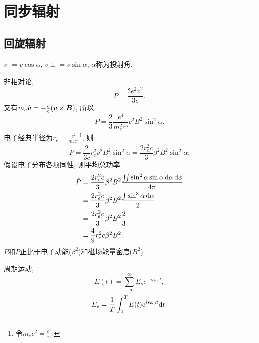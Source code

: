 \chapter{同步辐射}

\section{回旋辐射}\label{cyclotron}

$v_\parallel=v\cos\alpha$, $v\perp=v\sin\alpha$, $\alpha$称为投射角.

非相对论,
\begin{equation}
    P=\frac{2e^2\dot{v}^2}{3c}.
\end{equation}
又有$m_e\dot{\boldsymbol{v}}=-\frac{e}{c}(\boldsymbol{v}\times\boldsymbol{B})$, 所以
\begin{equation}
    P=\frac{2}{3}\frac{e^4}{m_e^2c^5}v^2B^2\sin^2\alpha.
\end{equation}
电子经典半径为$r_e=\frac{e^2}{m_ec^2}$\footnote{令$m_ec^2=\frac{e^2}{r_e}$.}, 则
\begin{equation}
    P=\frac{2}{3c}r_e^2v^2B^2\sin^2\alpha=\frac{2r_e^2c}{3}\beta^2B^2\sin^2\alpha.
\end{equation}
假设电子分布各项同性, 则平均总功率
\begin{align}
    \bar{P}&=\frac{2r_e^2c}{3}\beta^2B^2\frac{\iint\sin^2\alpha\sin\alpha\,\mathrm{d}\alpha\,\mathrm{d}\phi}{4\pi}\\
    &=\frac{2r_e^2c}{3}\beta^2B^2\frac{\int\sin^3\alpha\,\mathrm{d}\alpha}{2}\\
    &=\frac{2r_e^2c}{3}\beta^2B^2\frac{2}{3}\\
    &=\frac{4}{9}r_e^2c\beta^2B^2.
\end{align}
$P$和$\bar{P}$正比于电子动能($\beta^2$)和磁场能量密度($B^2$).

周期运动,
\begin{equation}
    E(t)=\sum_{-\infty}^{\infty} E_se^{-is\omega_0 t},
\end{equation}
\begin{equation}
    E_s=\frac{1}{T}\int_0^T E(t)e^{is\omega_0 t}\mathrm{d} t.
\end{equation}

